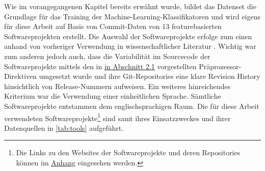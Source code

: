 Wie im vorangegangenen Kapitel bereits erwähnt wurde, bildet das Datenset die Grundlage für das Training der Machine-Learning-Klassifikatoren und wird eigens für diese Arbeit auf Basis von Commit-Daten von 13 featurebasierten Softwareprojekten erstellt. Die Auswahl der Softwareprojekte erfolge zum einen anhand von vorheriger Verwendung in wissenschaftlicher Literatur \cite{Hunsen2015,Liebig2010,Queiroz2015,Queiroz2016}. Wichtig war zum anderen jedoch auch, dass die Variabilität im Sourcecode der Softwareprojekte mittels den in \hyperref[feat-develop]{in Abschnitt 2.1} vorgestellten Präprozessor-Direktiven umgesetzt wurde und ihre Git-Repositories eine klare \glqq Revision History\grqq{} hinsichtlich von Release-Nummern aufweisen. Ein weiteres hinreichendes Kriterium war die Verwendung einer einheitlichen Sprache. Sämtliche Softwareprojekte entstammen dem englischsprachigen Raum. Die für diese Arbeit verwendeten Softwareprojekte\footnote{Die Links zu den Websites der Softwareprojekte und deren Repositories können im \hyperref[appendix1]{Anhang} eingesehen werden.} sind samt ihres Einsatzzweckes und ihrer Datenquellen in \autoref{tab:tools} aufgeführt.

